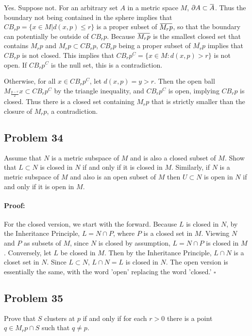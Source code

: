 \documentclass{article}
\newenvironment{proof}{\paragraph{Proof:}}{\hfill$\square$}
\newcommand{\overbar}[1]{\mkern 1.5mu\overline{\mkern-1.5mu#1\mkern-1.5mu}\mkern 1.5mu}
\begin{document}
Yes. Suppose not. For an arbitrary set $A$ in a metric space $M$, $\partial A \subset \overbar{A}$. Thus the boundary not being contained in the sphere implies that $CB_r p = \{x \in M| d(x, p) \leq r\}$ is a proper subset of $\overbar{M_r p}$, so that the boundary can potentially be outside of $CB_r p$. Because $\overbar{M_r p}$ is the smallest closed set that contains $M_r p$ and $M_r p \subset CB_r p$, $CB_r p$ being a proper subset of $\bar{M_r p}$ implies that $CB_r p$ is not closed. This implies that $CB_r p^C = \{x \in M: d(x, p) > r \}$ is not open. If $CB_r p^C$ is the null set, this is a contradiction.

Otherwise, for all $x \in CB_r p^C$, let $d(x, p) = y > r$. Then the open ball $M_{\frac{y-r}{2}} x \subset CB_r p^C$ by the triangle inequality, and $CB_r p^C$ is open, implying $CB_r p$ is closed. Thus there is a closed set containing $M_r p$ that is strictly smaller than the closure of $M_r p$, a contradiction.

\subsection*{Problem 34}

Assume that $N$ is a metric subspace of $M$ and is also a closed subset of $M$. Show that $L \subset N$ is closed in $N$ if and only if it is closed in $M$. Similarly, if $N$ is a metric subspace of $M$ and also is an open subset of $M$ then $U \subset N$ is open in $N$ if and only if it is open in $M$.

\begin{proof}
For the closed version, we start with the forward. Because $L$ is closed in $N$, by the Inheritance Principle, $L = N \cap P$, where $P$ is a closed set in $M$. Viewing $N$ and $P$ as subsets of $M$, since $N$ is closed by assumption, $L = N \cap P$ is closed in $M$. Conversely, let $L$ be closed in $M$. Then by the Inheritance Principle, $L \cap N$ is a closet set in $N$. Since $L \subset N$, $L \cap N = L$ is closed in $N$. The open version is essentially the same, with the word 'open' replacing the word 'closed.'
\end{proof}

\subsection*{Problem 35}
Prove that $S$ clusters at $p$ if and only if for each $r > 0$ there is a point $q \in M_r p \cap S$ such that $q \neq p$.
\end{document}
